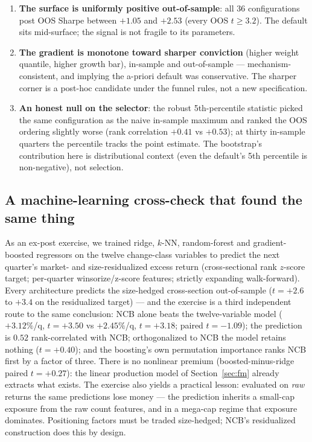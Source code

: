 \begin{enumerate}
\item \textbf{The surface is uniformly positive out-of-sample}: all
  36 configurations post OOS Sharpe between $+1.05$ and $+2.53$
  (every OOS $t \ge 3.2$). The default sits mid-surface; the signal
  is not fragile to its parameters.
\item \textbf{The gradient is monotone toward sharper conviction}
  (higher weight quantile, higher growth bar), in-sample and
  out-of-sample --- mechanism-consistent, and implying the a-priori
  default was conservative. The sharper corner is a post-hoc
  candidate under the funnel rules, not a new specification.
\item \textbf{An honest null on the selector}: the robust
  5th-percentile statistic picked the same configuration as the naive
  in-sample maximum and ranked the OOS ordering slightly worse
  (rank correlation $+0.41$ vs $+0.53$); at thirty in-sample
  quarters the percentile tracks the point estimate. The bootstrap's
  contribution here is distributional context (even the default's 5th
  percentile is non-negative), not selection.
\end{enumerate}

\subsection{A machine-learning cross-check that found the same thing}
\label{sec:ml}

As an ex-post exercise, we trained ridge, $k$-NN, random-forest and
gradient-boosted regressors on the twelve change-class variables to
predict the next quarter's market- and size-residualized excess
return (cross-sectional rank $z$-score target; per-quarter
winsorize/z-score features; strictly expanding walk-forward). Every
architecture predicts the size-hedged cross-section out-of-sample
($t=+2.6$ to $+3.4$ on the residualized target) --- and the exercise
is a third independent route to the same conclusion: NCB alone beats
the twelve-variable model ($+3.12\%$/q, $t=+3.50$ vs $+2.45\%$/q,
$t=+3.18$; paired $t=-1.09$); the prediction is $0.52$
rank-correlated with NCB; orthogonalized to NCB the model retains
nothing ($t=+0.40$); and the boosting's own permutation importance
ranks NCB first by a factor of three. There is no nonlinear premium
(boosted-minus-ridge paired $t=+0.27$): the linear production model
of Section~\ref{sec:fm} already extracts what exists. The exercise
also yields a practical lesson: evaluated on \emph{raw} returns the
same predictions lose money --- the prediction inherits a small-cap
exposure from the raw count features, and in a mega-cap regime that
exposure dominates. Positioning factors must be traded size-hedged;
NCB's residualized construction does this by design.
